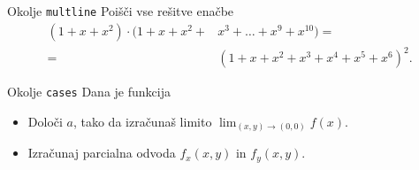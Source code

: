 \begin{frame}{Okolje \texttt{multline}}
	Poišči vse rešitve enačbe
	\begin{align*}
		(1+x+x^2) \cdot (1+x+x^2+&x^3+\ldots+x^9+x^{10}) = \\
	=&(1+x+x^2+x^3+x^4+x^5+x^6)^2.
	\end{align*}
	
	
\end{frame}

\begin{frame}{Okolje \texttt{cases}}
	Dana je funkcija
	
		
	\begin{itemize}
	\item Določi $a$, tako da izračunaš limito \( \lim_{(x,y)\to(0,0)} f(x). \)
	\item Izračunaj parcialna odvoda $f_x(x,y)$ in $f_y(x,y)$.
	\end{itemize}
\end{frame}
